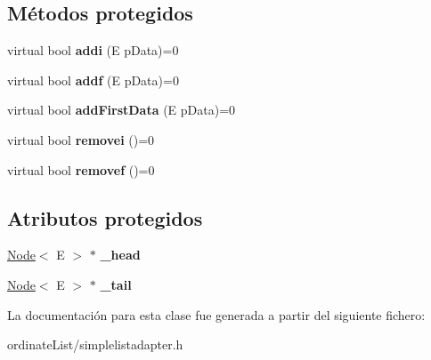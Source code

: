 \subsection*{Métodos protegidos}
\begin{DoxyCompactItemize}
\item 
\hypertarget{classSimpleListAdapter_abfd8b7cecf59921fb985f2121e246c99}{virtual bool {\bfseries addi} (E p\-Data)=0}\label{classSimpleListAdapter_abfd8b7cecf59921fb985f2121e246c99}

\item 
\hypertarget{classSimpleListAdapter_a89d3c954a3782181f871b30c7a726379}{virtual bool {\bfseries addf} (E p\-Data)=0}\label{classSimpleListAdapter_a89d3c954a3782181f871b30c7a726379}

\item 
\hypertarget{classSimpleListAdapter_a269a73b10beb87dddb3330af47334522}{virtual bool {\bfseries add\-First\-Data} (E p\-Data)=0}\label{classSimpleListAdapter_a269a73b10beb87dddb3330af47334522}

\item 
\hypertarget{classSimpleListAdapter_a9bebc8a42330e453f6e608e54de36adf}{virtual bool {\bfseries removei} ()=0}\label{classSimpleListAdapter_a9bebc8a42330e453f6e608e54de36adf}

\item 
\hypertarget{classSimpleListAdapter_a9008dff51a5a156c0929b972e59e8f1d}{virtual bool {\bfseries removef} ()=0}\label{classSimpleListAdapter_a9008dff51a5a156c0929b972e59e8f1d}

\end{DoxyCompactItemize}
\subsection*{Atributos protegidos}
\begin{DoxyCompactItemize}
\item 
\hypertarget{classSimpleListAdapter_af8279a43660863dbf56cc31d27c331df}{\hyperlink{classNode}{Node}$<$ E $>$ $\ast$ {\bfseries \-\_\-head}}\label{classSimpleListAdapter_af8279a43660863dbf56cc31d27c331df}

\item 
\hypertarget{classSimpleListAdapter_aee311f35611a7a15c68ee78ea5b7394c}{\hyperlink{classNode}{Node}$<$ E $>$ $\ast$ {\bfseries \-\_\-tail}}\label{classSimpleListAdapter_aee311f35611a7a15c68ee78ea5b7394c}

\end{DoxyCompactItemize}


La documentación para esta clase fue generada a partir del siguiente fichero\-:\begin{DoxyCompactItemize}
\item 
ordinate\-List/simplelistadapter.\-h\end{DoxyCompactItemize}
